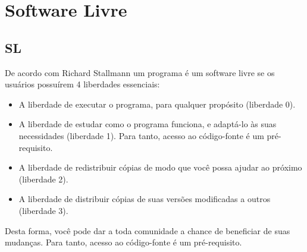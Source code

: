 \chapter{Software Livre}
\label{cap:midias-sociais}

\section{SL}

%
De acordo com Richard Stallmann  um programa é um software livre se os usuários possuírem 4 liberdades essenciais:
\begin{itemize}
\item A liberdade de executar o programa, para qualquer propósito (liberdade 0).
\item A liberdade de estudar como o programa funciona, e adaptá-lo às suas necessidades (liberdade 1). Para tanto, acesso ao código-fonte é um pré-requisito.
\item A liberdade de redistribuir cópias de modo que você possa ajudar ao próximo (liberdade 2).
\item A liberdade de distribuir cópias de suas versões modificadas a outros (liberdade 3).
\end{itemize}

Desta forma, você pode dar a toda comunidade a chance de beneficiar de suas mudanças. Para tanto, acesso ao código-fonte é um pré-requisito.